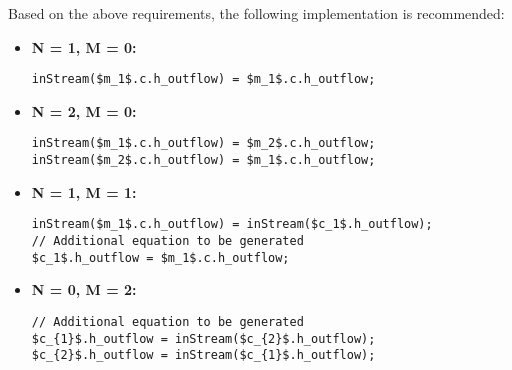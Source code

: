 \begin{nonnormative}
Based on the above requirements, the following implementation is recommended:
\begin{itemize}
\raggedright
\item \textbf{N = 1, M = 0:}\newline
\begin{lstlisting}[language=modelica,mathescape=true]
inStream($m_1$.c.h_outflow) = $m_1$.c.h_outflow;
\end{lstlisting}
\item
\textbf{N = 2, M = 0:}\newline
\begin{lstlisting}[language=modelica,mathescape=true]
inStream($m_1$.c.h_outflow) = $m_2$.c.h_outflow;
inStream($m_2$.c.h_outflow) = $m_1$.c.h_outflow;
\end{lstlisting}
\item \textbf{N = 1, M = 1:}\newline
\begin{lstlisting}[language=modelica,mathescape=true]
inStream($m_1$.c.h_outflow) = inStream($c_1$.h_outflow);
// Additional equation to be generated
$c_1$.h_outflow = $m_1$.c.h_outflow;
\end{lstlisting}
\item \textbf{N = 0, M = 2:}\newline
\begin{lstlisting}[language=modelica,mathescape=true]
// Additional equation to be generated
$c_{1}$.h_outflow = inStream($c_{2}$.h_outflow);
$c_{2}$.h_outflow = inStream($c_{1}$.h_outflow);
\end{lstlisting}


\end{itemize}
\end{nonnormative}

